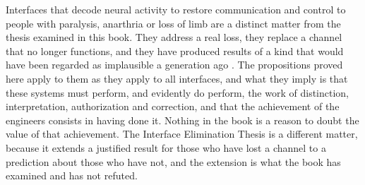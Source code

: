 \documentclass[11pt,twoside,openany]{book}
\theoremstyle{definition}
\theoremstyle{remark}
\begin{document}
Interfaces that decode neural activity to restore communication and control to people with paralysis, anarthria or loss of limb are a distinct matter from the thesis examined in this book. They address a real loss, they replace a channel that no longer functions, and they have produced results of a kind that would have been regarded as implausible a generation ago \cite{hochberg2006,willett2021,moses2021,willett2023,metzger2023}. The propositions proved here apply to them as they apply to all interfaces, and what they imply is that these systems must perform, and evidently do perform, the work of distinction, interpretation, authorization and correction, and that the achievement of the engineers consists in having done it. Nothing in the book is a reason to doubt the value of that achievement. The Interface Elimination Thesis is a different matter, because it extends a justified result for those who have lost a channel to a prediction about those who have not, and the extension is what the book has examined and has not refuted.
\end{document}
